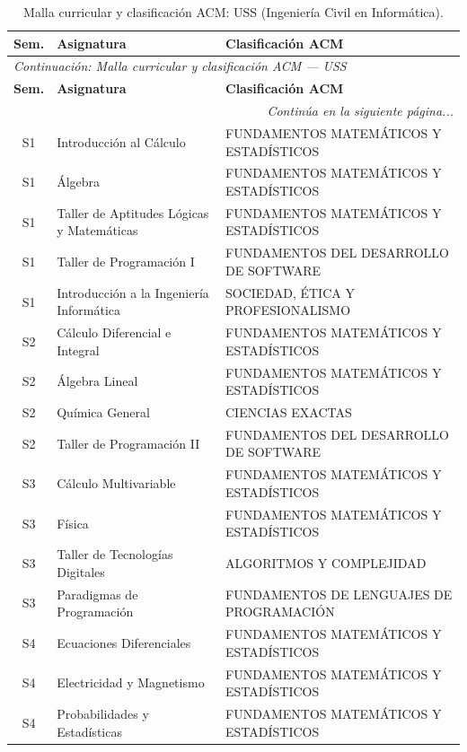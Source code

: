\documentclass[11pt,a4paper]{article}
\begin{document}
\begin{small}
\begin{longtable}{c >{\raggedright\arraybackslash}p{8.5cm} >{\raggedright\arraybackslash}p{5.5cm}}
\caption{Malla curricular y clasificación ACM: USS (Ingeniería Civil en Informática).} \label{tab:USS11} \\
\toprule
\textbf{Sem.} & \textbf{Asignatura} & \textbf{Clasificación ACM} \\
\midrule
\endfirsthead
\multicolumn{3}{l}{\small\textit{Continuación: Malla curricular y clasificación ACM --- USS}} \\[3pt]
\toprule
\textbf{Sem.} & \textbf{Asignatura} & \textbf{Clasificación ACM} \\
\midrule
\endhead
\midrule
\multicolumn{3}{r}{\small\textit{Continúa en la siguiente página...}} \\
\endfoot
\bottomrule
\endlastfoot
S1 & Introducción al Cálculo & FUNDAMENTOS MATEMÁTICOS Y ESTADÍSTICOS \\
S1 & Álgebra & FUNDAMENTOS MATEMÁTICOS Y ESTADÍSTICOS \\
S1 & Taller de Aptitudes Lógicas y Matemáticas & FUNDAMENTOS MATEMÁTICOS Y ESTADÍSTICOS \\
S1 & Taller de Programación I & FUNDAMENTOS DEL DESARROLLO DE SOFTWARE \\
S1 & Introducción a la Ingeniería Informática & SOCIEDAD, ÉTICA Y PROFESIONALISMO \\
S2 & Cálculo Diferencial e Integral & FUNDAMENTOS MATEMÁTICOS Y ESTADÍSTICOS \\
S2 & Álgebra Lineal & FUNDAMENTOS MATEMÁTICOS Y ESTADÍSTICOS \\
S2 & Química General & CIENCIAS EXACTAS \\
S2 & Taller de Programación II & FUNDAMENTOS DEL DESARROLLO DE SOFTWARE \\
S3 & Cálculo Multivariable & FUNDAMENTOS MATEMÁTICOS Y ESTADÍSTICOS \\
S3 & Física & FUNDAMENTOS MATEMÁTICOS Y ESTADÍSTICOS \\
S3 & Taller de Tecnologías Digitales & ALGORITMOS Y COMPLEJIDAD \\
S3 & Paradigmas de Programación & FUNDAMENTOS DE LENGUAJES DE PROGRAMACIÓN \\
S4 & Ecuaciones Diferenciales & FUNDAMENTOS MATEMÁTICOS Y ESTADÍSTICOS \\
S4 & Electricidad y Magnetismo & FUNDAMENTOS MATEMÁTICOS Y ESTADÍSTICOS \\
S4 & Probabilidades y Estadísticas & FUNDAMENTOS MATEMÁTICOS Y ESTADÍSTICOS \\

\end{longtable}
\end{small}
\end{document}
